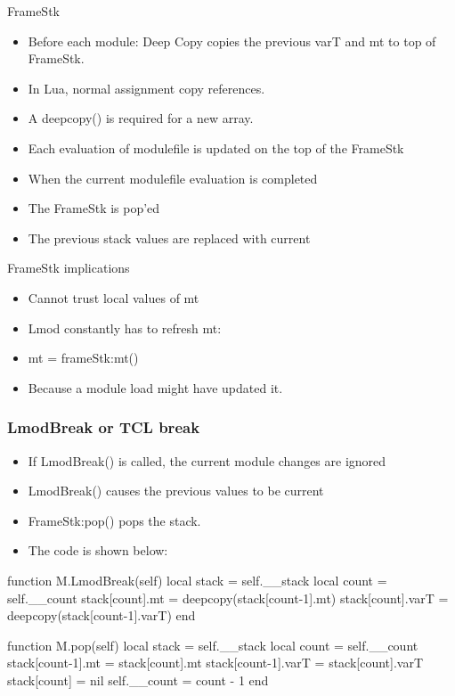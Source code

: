 \documentclass{beamer}
\begin{document}
\begin{frame}{FrameStk}
  \begin{itemize}
    \item Before each module: Deep Copy copies the previous varT and mt to top of
      FrameStk.
    \item In Lua, normal assignment copy references.
    \item A deepcopy() is required for a new array.
    \item Each evaluation of modulefile is updated on the top of the
      FrameStk
    \item When the current modulefile evaluation is completed
    \item The FrameStk is pop'ed
    \item The previous stack values are replaced with current
  \end{itemize}
\end{frame}

\begin{frame}{FrameStk implications}
  \begin{itemize}
    \item Cannot trust local values of mt
    \item Lmod constantly has to refresh mt:
    \item {\color{blue}mt = frameStk:mt()}
    \item Because a module load might have updated it.
  \end{itemize}
\end{frame}

\begin{frame}[fragile]
    \frametitle{LmodBreak or TCL break}
  \begin{itemize}
    \item If LmodBreak() is called, the current module changes are
      ignored
    \item LmodBreak() causes the previous values to be current
    \item FrameStk:pop() pops the stack.
    \item The code is shown below:
  \end{itemize}
 {\tiny
    \begin{semiverbatim}
function M.LmodBreak(self)
   local stack           = self.\_\_stack
   local count           = self.\_\_count
   stack[count].mt       = deepcopy(stack[count-1].mt)
   stack[count].varT     = deepcopy(stack[count-1].varT)
end

function M.pop(self)
   local stack           = self.\_\_stack
   local count           = self.\_\_count
   stack[count-1].mt     = stack[count].mt
   stack[count-1].varT   = stack[count].varT
   stack[count]          = nil
   self.__count          = count - 1
end
    \end{semiverbatim}
}
\end{frame}
\end{document}
